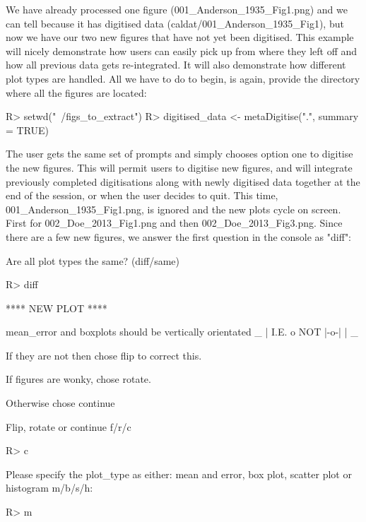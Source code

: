 \documentclass[article]{jss}
\begin{document}
We have already processed one figure (001\_Anderson\_1935\_Fig1.png) and we can tell because it has digitised data (caldat/001\_Anderson\_1935\_Fig1), but now we have our two new figures that have not yet been digitised. This example will nicely demonstrate how users can easily pick up from where they left off and how all previous data gets re-integrated. It will also demonstrate how different plot types are handled. All we have to do to begin, is again, provide the directory where all the figures are located:

\begin{CodeChunk}
\begin{CodeInput}
R> setwd("~/figs_to_extract")
R> digitised_data <- metaDigitise(".", summary = TRUE)
\end{CodeInput}
\end{CodeChunk}

The user gets the same set of prompts and simply chooses option one to digitise the new figures. This will permit users to digitise new figures, and will integrate previously completed digitisations along with newly digitised data together at the end of the session, or when the user decides to quit. This time, 001\_Anderson\_1935\_Fig1.png, is ignored and the new plots cycle on screen. First for 002\_Doe\_2013\_Fig1.png and then 002\_Doe\_2013\_Fig3.png. Since there are a few new figures, we answer the first question in the  console as "diff":

\begin{CodeChunk}
\begin{CodeOutput}
Are all plot types the same? (diff/same) 
\end{CodeOutput}
\begin{CodeInput}
R> diff
\end{CodeInput}
\begin{CodeOutput}
**** NEW PLOT ****

mean_error and boxplots should be vertically orientated
       _ 
       |  
  I.E. o    NOT  |-o-|
       |
       _

If they are not then chose flip to correct this.

If figures are wonky, chose rotate.

Otherwise chose continue

Flip, rotate or continue f/r/c 
\end{CodeOutput}
\begin{CodeInput}
R> c
\end{CodeInput}
\begin{CodeOutput}
Please specify the plot_type as either: mean and error, box plot,
scatter plot or histogram m/b/s/h: 
\end{CodeOutput}
\begin{CodeInput}
R> m
\end{CodeInput}
\end{CodeChunk}
\end{document}
